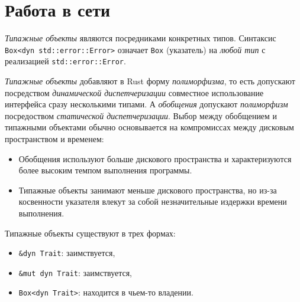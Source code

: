 \documentclass[%
	11pt,
	a4paper,
	utf8,
		]{article}
\begin{document}
\section{Работа в сети}

\emph{Типажные объекты} являются посредниками конкретных типов. Синтаксис \verb|Box<dyn std::error::Error>| означает \verb|Box| (указатель) на \emph{любой тип} с реализацией \verb|std::error::Error|.

\emph{Типажные объекты} добавляют в Rust форму \emph{полиморфизма}, то есть допускают посредством \emph{динамической диспетчеризации} совместное использование интерфейса сразу несколькими типами. А \emph{обобщения} допускают \emph{полиморфизм} посредоством \emph{статической диспетчеризации}. Выбор между обобщением и типажными объектами обычно основывается на компромиссах между дисковым пространством и временем:
\begin{itemize}
	\item Обобщения используют больше дискового пространства и характеризуются более высоким темпом выполнения программы.
	
	\item Типажные объекты занимают меньше дискового пространства, но из-за косвенности указателя влекут за собой незначительные издержки времени выполнения.
\end{itemize}

Типажные объекты существуют в трех формах:
\begin{itemize}
	\item \verb|&dyn Trait|: заимствуется,
	
	\item \verb|&mut dyn Trait|: заимствуется,
	
	\item \verb|Box<dyn Trait>|: находится в чьем-то владении.
\end{itemize}
\end{document}
